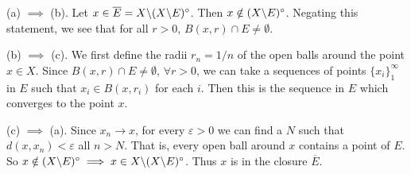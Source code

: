 
\begin{solution}
    (a) $\implies$ (b).
    Let $x\in \overline{E}=X\char`\\(X\char`\\E)^\circ$.
    Then $x\notin (X\char`\\E)^\circ$. Negating this
    statement, we see that for all $r>0$,
    $B(x,r)\cap E\neq \emptyset$.
    
    \vspace*{3mm}
    (b) $\implies$ (c).
    We first define the radii $r_n=1/n$ of the open balls
    around the point $x\in X$. Since
    $B(x,r) \cap E \neq \emptyset$, $\forall r > 0$,
    we can take a sequences of points 
    $\{x_i\}_1^\infty$ in $E$ such that
    $x_i\in B(x,r_i)$ for each $i$.
    Then this is the sequence in $E$
    which converges to the point $x$.

    \vspace*{3mm}
    (c) $\implies$ (a). Since $x_n\to x$, for
    every $\varepsilon>0$
    we can find a $N$ such that $d(x,x_n)<\varepsilon$
    all $n>N$. That is, every open ball around
    $x$ contains a point of $E$. So $x\notin 
    (X\char`\\E)^\circ\implies x\in
    X\char`\\(X\char`\\E)^\circ$. Thus $x$ is in the
    closure $\overline{E}$.
\end{solution}